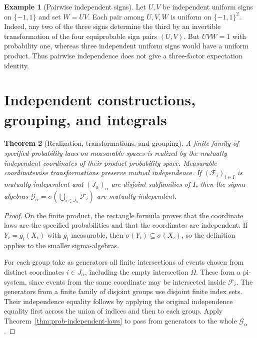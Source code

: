 \documentclass[11pt,oneside,openany]{book}
\theoremstyle{plain}
\newtheorem{theorem}{Theorem}[chapter]
\theoremstyle{definition}
\newtheorem{example}[theorem]{Example}
\theoremstyle{remark}
\begin{document}
\begin{example}[Pairwise independent signs]
\label{ex:prob-pairwise-signs}
Let \(U,V\) be independent uniform signs on \(\{-1,1\}\) and set
\(W=UV\). Each pair among \(U,V,W\) is uniform on \(\{-1,1\}^2\).
Indeed, any two of the three signs determine the third by an
invertible transformation of the four equiprobable sign pairs
\((U,V)\). But \(UVW=1\) with probability one, whereas three
independent uniform signs would have a uniform product. Thus pairwise
independence does not give a three-factor expectation identity.
\end{example}

\section{Independent constructions, grouping, and integrals}
\label{p02-02}

\begin{theorem}[Realization, transformations, and grouping]
\label{thm:prob-independent-grouping}
A finite family of specified probability laws on measurable spaces is
realized by the mutually independent coordinates of their product
probability space. Measurable coordinatewise transformations preserve
mutual independence. If \((\mathcal F_i)_{i\in I}\) is mutually
independent and \((J_\alpha)_\alpha\) are disjoint subfamilies of \(I\),
then the sigma-algebras
\(\mathcal G_\alpha=\sigma(\bigcup_{i\in J_\alpha}\mathcal F_i)\)
are mutually independent.
\end{theorem}
\begin{proof}
On the finite product, the rectangle formula proves that the
coordinate laws are the specified probabilities and that the
coordinates are independent. If \(Y_i=g_i(X_i)\) with \(g_i\)
measurable, then \(\sigma(Y_i)\subseteq\sigma(X_i)\), so the
definition applies to the smaller sigma-algebras.

For each group take as generators all finite intersections of events
chosen from distinct coordinates \(i\in J_\alpha\), including the
empty intersection \(\Omega\). These form a pi-system, since events
from the same coordinate may be intersected inside \(\mathcal F_i\).
The generators from a finite family of disjoint groups use disjoint
finite index sets. Their independence equality follows by applying
the original independence equality first across the union of indices
and then to each group. Apply
Theorem~\ref{thm:prob-independent-laws} to pass from generators to
the whole \(\mathcal G_\alpha\).
\end{proof}
\end{document}
